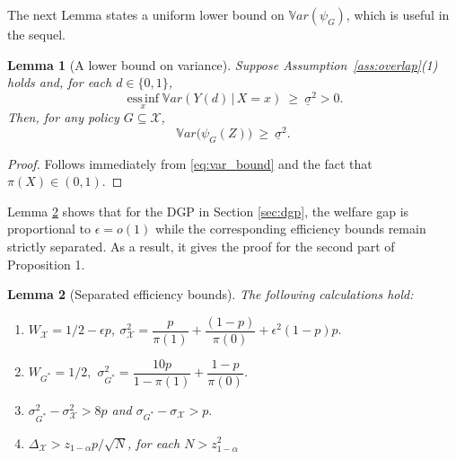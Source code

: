 \documentclass[12pt]{article}
\numberwithin{equation}{section}
\theoremstyle{plain}                         %
\newtheorem{lemma}{Lemma}
\theoremstyle{definition}                  %
\theoremstyle{remark}                      %
\newcommand{\Var}{\mathbb{V}ar}
\begin{document}
The next Lemma states a uniform lower bound on $\Var(\psi_G)$, which is useful in the sequel.



\begin{lemma}[A lower bound on variance]
\label{lem:dr-cov-lower}
Suppose Assumption~\ref{ass:overlap}(1) holds and, for each $d\in\{0,1\}$,
\[
\operatorname*{ess\,inf}_{x}\Var\left(Y(d)\,|\,X=x\right)\ \ge\ \underline{\sigma}^2>0.
\]
Then, for any policy $G\subseteq\mathcal X$,
\[
\Var\!\big(\psi_G(Z)\big)\ \ge\ \underline{\sigma}^2.
\]
\end{lemma}

\begin{proof}
Follows immediately from \eqref{eq:var_bound} and the fact that $\pi(X) \in (0, 1)$. 
\end{proof}





Lemma \ref{lem:mylem} shows that for the DGP in Section \ref{sec:dgp}, the welfare gap is proportional to $\epsilon = o(1)$ while the corresponding efficiency bounds remain strictly separated. As a result, it gives the proof for the second part of Proposition 1.

\begin{lemma}[Separated efficiency bounds]
\label{lem:mylem}
The following calculations hold:

\begin{enumerate}
	\item $W_{\mathcal{X}} = 1/2 - \epsilon p$,\;\; $\sigma^2_{\mathcal{X}} =  \dfrac{p}{ \pi (1)}  + \dfrac{(1-p) }{ \pi (0)} + \epsilon^2 (1-p)p.$
\item $W_{G^{*}} = 1/2,$ \;\;$\sigma^2_{G^{*}} = \dfrac{10 p}{ 1-\pi (1)}
 + \dfrac{1-p}{ \pi (0)}$.

\item $\sigma^2_{G^{*}}-\sigma^2_{\mathcal{X}} > 8p$ and $\sigma_{G^{*}}-\sigma_{\mathcal{X}} > p.$

\item $\Delta_{\mathcal{X}} > z_{1-\alpha} p /\sqrt{N}$, for each $N > z_{1-\alpha}^2$
\end{enumerate}
\end{lemma}
\end{document}
